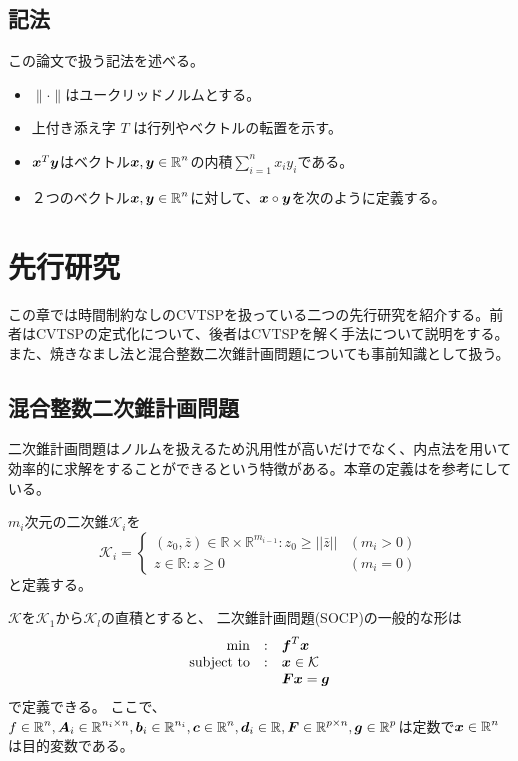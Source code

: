 \documentclass[11pt,a4paper,dvipdfmx,titlepage,uplatex]{jsarticle}
\theoremstyle{mystyle}
\newcommand{\0}{\mathbf{0}}
\def\b{\mbox{\boldmath $b$}}
\def\c{\mbox{\boldmath $c$}}
\def\d{\mbox{\boldmath $d$}}
\def\f{\mbox{\boldmath $f$}}
\def\g{\mbox{\boldmath $g$}}
\def\x{\mbox{\boldmath $x$}}
\def\y{\mbox{\boldmath $y$}}
\def\A{\mbox{\boldmath $A$}}
\def\F{\mbox{\boldmath $F$}}
\def\Real{\mbox{$\mathbb{R}$}}
\begin{document}
	\subsection{記法}\label{sec:notation}
	
	
	この論文で扱う記法を述べる。
	\begin{itemize}
		\item $\|\cdot\|$はユークリッドノルムとする。
		\item 上付き添え字 $T$ は行列やベクトルの転置を示す。
		\item $\x^T \y$はベクトル$\x,\y \in \Real^n$の内積$\sum_{i=1}^n x_i y_i$である。
		\item ２つのベクトル$\x , \y \in \Real^n$に対して、$\x \circ \y$を次のように定義する。
	\end{itemize}
	
	\clearpage
	\section{先行研究}\label{sec:previousResarch}
	この章では時間制約なしのCVTSPを扱っている二つの先行研究を紹介する。前者はCVTSPの定式化について、後者はCVTSPを解く手法について説明をする。また、焼きなまし法と混合整数二次錐計画問題についても事前知識として扱う。
	\subsection{混合整数二次錐計画問題}\label{sec:MISOCP}
	二次錐計画問題はノルムを扱えるため汎用性が高いだけでなく、内点法を用いて効率的に求解をすることができるという特徴がある。\cite{potra2000interior}本章の定義は\cite{boyd2004convex}を参考にしている。
	
	$m_i$次元の二次錐$\mathcal{K}_i$を
	\begin{equation}
		\mathcal{K}_i  = 
		\begin{cases}
			(z_0, \bar{z}) \in \Real \times \Real^{m_{i-1}}:z_0\geq ||\bar{z}||&(m_i > 0)\\
			z \in \Real:z\geq 0&(m_i = 0)
		\end{cases}
	\end{equation}
	と定義する。
	
	$\mathcal{K}$を$\mathcal{K}_1$から$\mathcal{K}_l$の直積とすると、
	二次錐計画問題(SOCP)の一般的な形は
	\begin{align}
		\begin{array}{rcl}
			\min & : & \f ^T\x \\
			\text{subject to} & : &\x \in \mathcal{K} \\
			& & \F\x=\g\\
		\end{array}
	\end{align}
	で定義できる。
	ここで、$f \in \Real^n , \A_i \in \Real^{n_i\times n}, \b_i \in \Real^{n_i}, \c \in \Real^n, \d_i \in \Real, \F \in \Real^{p\times n}, \g \in \Real^p$は定数で$\x \in \Real^n$は目的変数である。
	
\end{document}
